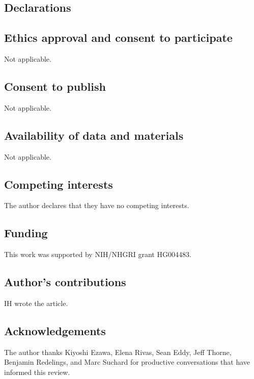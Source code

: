 \documentclass{bmcart}
\begin{document}
\begin{backmatter}

\section*{Declarations}
\subsection*{Ethics approval and consent to participate}
Not applicable.
\subsection*{Consent to publish}
Not applicable.
\subsection*{Availability of data and materials}
Not applicable.
\subsection*{Competing interests}
  The author declares that they have no competing interests.

\subsection*{Funding}
This work was supported by NIH/NHGRI grant HG004483.
\subsection*{Author's contributions}
    IH wrote the article.

\subsection*{Acknowledgements}
  The author thanks Kiyoshi Ezawa, Elena Rivas, Sean Eddy, Jeff Thorne,
  Benjamin Redelings, and Marc Suchard
  for productive conversations that have informed this review.


\end{backmatter}
\end{document}
